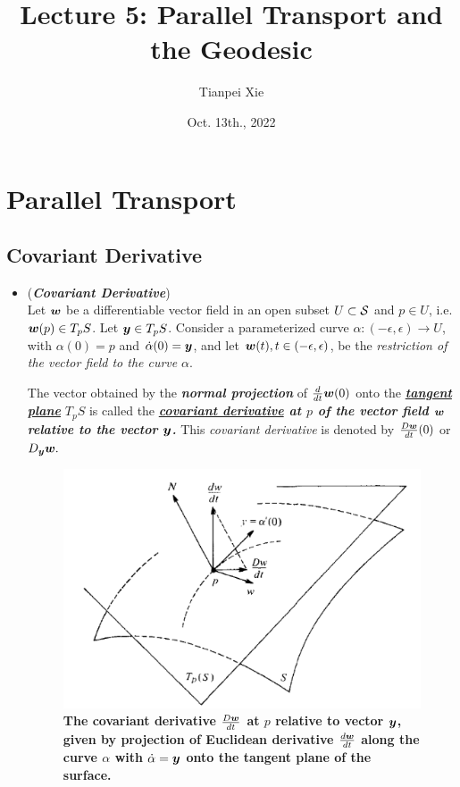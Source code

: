 \documentclass[11pt]{article}
\begin{document}
\title{Lecture 5: Parallel Transport and the Geodesic}
\author{ Tianpei Xie}
\date{Oct. 13th., 2022}
\maketitle
\tableofcontents
\newpage
\section{Parallel Transport}
\subsection{Covariant Derivative}
\begin{itemize}
\item \begin{definition} (\emph{\textbf{Covariant Derivative}})\citep{do1976differential}\\
Let $\boldsymbol{w}$ be a differentiable vector field in an open subset $U \subset {\mathcal S}$ and $p\in U$, i.e. $\boldsymbol{w}(p) \in T_{p}S$. Let $\boldsymbol{y}\in T_{p}S$. Consider a parameterized curve $\alpha: (-\epsilon, \epsilon) \rightarrow U$, with $\alpha(0) = p$ and $\dot{\alpha}(0) = \boldsymbol{y}$, and let $\boldsymbol{w}(t), t\in (-\epsilon, \epsilon)$, be the \emph{restriction of the vector field to the curve} $\alpha$. 

The vector obtained by the \emph{\textbf{normal projection}} of $\frac{d}{dt}\boldsymbol{w}(0)$ onto the \underline{\emph{\textbf{tangent plane}}} $T_{p}S$ is called the \emph{\textbf{\underline{covariant derivative} at $p$ of the vector field $\boldsymbol{w}$ relative to the vector $\boldsymbol{y}$.}} This \emph{covariant derivative} is denoted by $\frac{D\boldsymbol{w}}{dt}(0)$ or $D_{\boldsymbol{y}}\boldsymbol{w}.$
\end{definition}

\begin{figure}[tb]
\centering
\begin{minipage}{0.6\linewidth}
 \centerline{\includegraphics[scale = 0.43]{cov_deriv.png}}
\end{minipage}
\caption{\scriptsize
\textbf{The covariant derivative $\frac{D\boldsymbol{w}}{dt}$ at $p$ relative to vector $\boldsymbol{y}$, given by projection of Euclidean derivative $\frac{d\boldsymbol{w}}{dt}$ along the curve $\alpha$ with $\dot{\alpha} = \boldsymbol{y}$ onto the tangent plane of the surface. }}
\end{figure}


\end{itemize}
\end{document}
